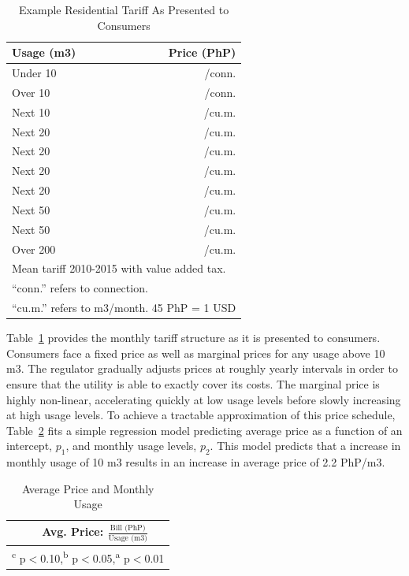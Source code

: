 \documentclass[12pt,table]{article}
\begin{document}
\begin{table}
\centering
\caption{Example Residential Tariff As Presented to Consumers}\label{table:tarifftrue}
\vspace{-2mm}
\begin{tabular}{l*{1}{r}}
\toprule
Usage (m3) & Price (PhP) \\
\midrule
Under   10    &   /conn. \\
Over    10    &   /conn. \\
Next    10    &   /cu.m. \\
Next    20    &   /cu.m. \\
Next    20    &   /cu.m. \\
Next    20    &   /cu.m. \\
Next    20    &   /cu.m. \\
Next    50    &   /cu.m. \\
Next    50    &   /cu.m. \\
Over   200    &   /cu.m. \\
\bottomrule
\multicolumn{2}{l}{\scriptsize Mean tariff 2010-2015 with value added tax. }\\[-.5em]
\multicolumn{2}{l}{\scriptsize ``conn.'' refers to connection. }\\[-.5em]
\multicolumn{2}{l}{\scriptsize ``cu.m.'' refers to m3/month.   45 PhP = 1 USD }
\end{tabular}
\end{table}

Table~\ref{table:tarifftrue} provides the monthly tariff structure as it is presented to consumers.  Consumers face a fixed price as well as marginal prices for any usage above 10 m3.  The regulator gradually adjusts prices at roughly yearly intervals in order to ensure that the utility is able to exactly cover its costs.  The marginal price is highly non-linear, accelerating quickly at low usage levels before slowly increasing at high usage levels.  To achieve a tractable approximation of this price schedule, Table~\ref{table:tcd_predict} fits a simple regression model predicting average price as a function of an intercept, $p_1$, and monthly usage levels, $p_2$.  This model predicts that a increase in monthly usage of 10 m3 results in an increase in average price of 2.2 PhP/m3.  

\begin{table}[H]
\small
\centering
\caption{Average Price and Monthly Usage}\label{table:tcd_predict}
\vspace{-2mm}
\begin{tabular}{lc}
\toprule
& \small Avg. Price: $\frac{\text{Bill (PhP)}}{\text{Usage (m3)}}$    \\
\midrule 

\bottomrule
\multicolumn{2}{l}{\scriptsize \textsuperscript{c} p$<$0.10,\textsuperscript{b} p$<$0.05,\textsuperscript{a} p$<$0.01 }
\end{tabular}
\end{table}
\end{document}
